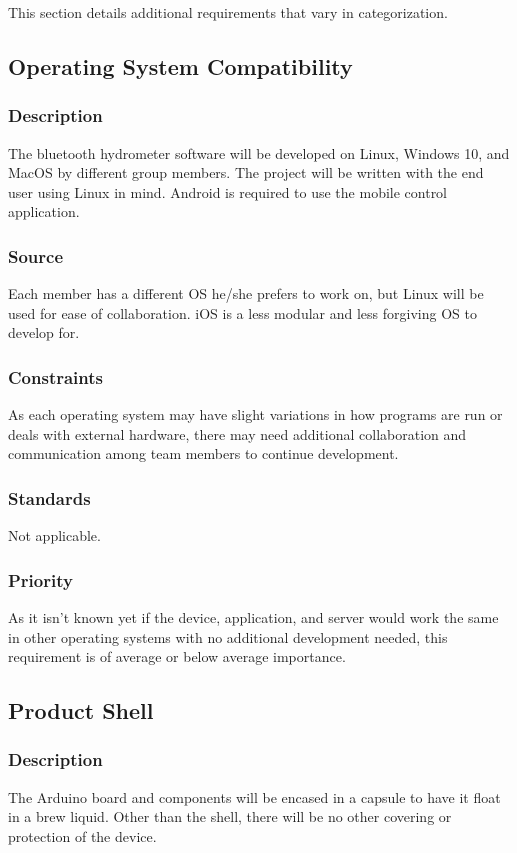 This section details additional requirements that vary in categorization.

\subsection{Operating System Compatibility}
\subsubsection{Description}
The bluetooth hydrometer software will be developed on Linux, Windows 10, and MacOS by different group members. The project will be written with the end user using Linux in mind. Android is required to use the mobile control application.
\subsubsection{Source}
Each member has a different OS he/she prefers to work on, but Linux will be used for ease of collaboration. iOS is a less modular and less forgiving OS to develop for.
\subsubsection{Constraints}
As each operating system may have slight variations in how programs are run or deals with external hardware, there may need additional collaboration and communication among team members to continue development.
\subsubsection{Standards}
Not applicable.
\subsubsection{Priority}
As it isn't known yet if the device, application, and server would work the same in other operating systems with no additional development needed, this requirement is of average or below average importance.
\subsection{Product Shell}
\subsubsection{Description}
The Arduino board and components will be encased in a capsule to have it float in a brew liquid. Other than the shell, there will be no other covering or protection of the device.
